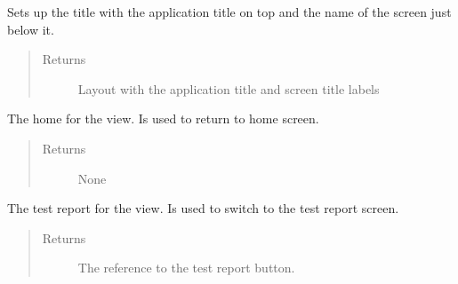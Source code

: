 \documentclass[letterpaper,10pt,english]{sphinxmanual}
\begin{document}
\begin{fulllineitems}
\begin{fulllineitems}
\end{fulllineitems}


\begin{fulllineitems}
\label{\detokenize{index:src.Views.View_LoadingScreen.LoadingWindow.setTitle}}
Sets up the title with the application title on top and the name of the screen just below it.
\begin{quote}\begin{description}
\item[{Returns}] \leavevmode
Layout with the application title and screen title labels

\end{description}\end{quote}

\end{fulllineitems}


\begin{fulllineitems}
\label{\detokenize{index:src.Views.View_LoadingScreen.LoadingWindow.set_BtnHome}}
The home for the view. Is used to return to home screen.
\begin{quote}\begin{description}
\item[{Returns}] \leavevmode
None

\end{description}\end{quote}

\end{fulllineitems}


\begin{fulllineitems}
\label{\detokenize{index:src.Views.View_LoadingScreen.LoadingWindow.set_BtnTestReport}}
The test report for the view. Is used to switch to the test report screen.
\begin{quote}\begin{description}
\item[{Returns}] \leavevmode
The reference to the test report button.


\end{description}
\end{quote}
\end{fulllineitems}
\end{fulllineitems}
\end{document}
